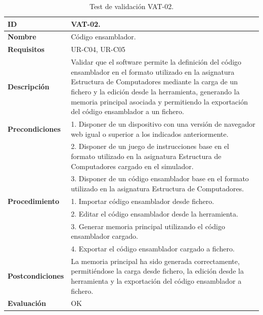 \begin{center}
\begin{table}[htb]
\centering
\caption{Test de validación VAT-02.}
\begin{tabular}{@{}p{2.5cm} p{9cm}@{}} 
\toprule
\textbf{ID} 					& VAT-02. \\
\midrule
\textbf{Nombre} 				& Código ensamblador. \\
\midrule
\textbf{Requisitos} 		& UR-C04, UR-C05 \\
\midrule
\textbf{Descripción} 		& Validar que el software permite la definición del código ensamblador en el formato utilizado en la asignatura Estructura de Computadores mediante la carga de un fichero y la edición desde la herramienta, generando la memoria principal asociada y permitiendo la exportación del código ensamblador a un fichero. \\
\midrule
\textbf{Precondiciones}		& 1. Disponer de un dispositivo con una versión de navegador web igual o superior a los indicados anteriormente. \\
											& 2. Disponer de un juego de instrucciones base en el formato utilizado en la asignatura Estructura de Computadores cargado en el simulador. \\
											& 3. Disponer de un código ensamblador base en el formato utilizado en la asignatura Estructura de Computadores. \\
\midrule
\textbf{Procedimiento}		& 1. Importar código ensamblador desde fichero.\\
											& 2. Editar el código ensamblador desde la herramienta.\\
											& 3. Generar memoria principal utilizando el código ensamblador cargado.\\
											& 4. Exportar el código ensamblador cargado a fichero. \\
\midrule
\textbf{Postcondiciones} 		&  La memoria principal ha sido generada correctamente, permitiéndose la carga desde fichero, la edición desde la herramienta y la exportación del código ensamblador a fichero.\\
\midrule
\textbf{Evaluación} 			& OK \\
\bottomrule
\end{tabular}
\label{tab:vat-02}
\end{table}
\end{center}

